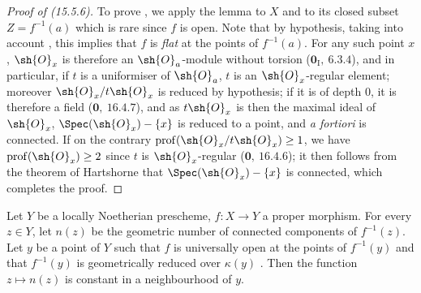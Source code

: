 \begin{proof}[Proof of {\rm (15.5.6)}]
To prove , we apply the lemma  to $X$ and to its closed subset $Z=f^{-1}(a)$ which is rare since $f$ is open.
Note that by hypothesis, taking into account , this implies that $f$ is \emph{flat} at the points of $f^{-1}(a)$.
For any such point $x$, $\sh{O}_x$ is therefore an $\sh{O}_a$-module without torsion ($\mathbf{0}_{\mathrm{I}},~6.3.4$), and in particular, if $t$ is a uniformiser of $\sh{O}_a$, $t$ is an $\sh{O}_x$-regular element; moreover $\sh{O}_x/t\sh{O}_x$ is reduced by hypothesis; if it is of depth $0$, it is therefore a field ($\mathbf{0},~16.4.7$), and as $t\sh{O}_x$ is then the maximal ideal of $\sh{O}_x$, $\Spec(\sh{O}_x)-\{x\}$ is reduced to a point, and \emph{a fortiori} is connected.
If on the contrary $\operatorname{prof}(\sh{O}_x/t\sh{O}_x)\geq 1$, we have $\operatorname{prof}(\sh{O}_x)\geq 2$ since $t$ is $\sh{O}_x$-regular ($\mathbf{0},~16.4.6$); it then follows from the theorem of Hartshorne  that $\Spec(\sh{O}_x)-\{x\}$ is connected, which completes the proof.
\end{proof}

\begin{proposition}[15.5.7]
\label{IV.15.5.7}
Let $Y$ be a locally Noetherian prescheme, $f:X\to Y$ a proper morphism.
For every $z\in Y$, let $n(z)$ be the geometric number of connected components of $f^{-1}(z)$.
Let $y$ be a point of $Y$ such that $f$ is universally open at the points of $f^{-1}(y)$ and that $f^{-1}(y)$ is geometrically reduced over $\kappa(y)$ .
Then the function $z\mapsto n(z)$ is constant in a neighbourhood of $y$.
\end{proposition}

